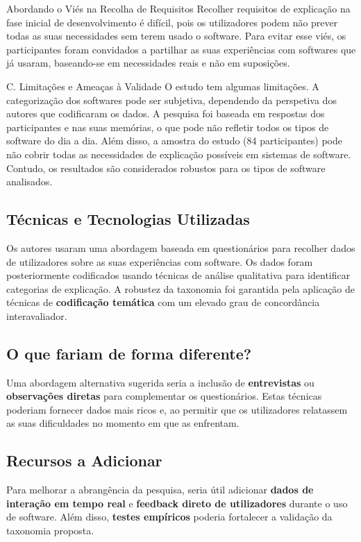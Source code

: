 \documentclass[conference]{IEEEtran}
\begin{document}
Abordando o Viés na Recolha de Requisitos
Recolher requisitos de explicação na fase inicial de desenvolvimento é difícil, pois os utilizadores podem não prever todas as suas necessidades sem terem usado o software. Para evitar esse viés, os participantes foram convidados a partilhar as suas experiências com softwares que já usaram, baseando-se em necessidades reais e não em suposições.

C. Limitações e Ameaças à Validade
O estudo tem algumas limitações. A categorização dos softwares pode ser subjetiva, dependendo da perspetiva dos autores que codificaram os dados. A pesquisa foi baseada em respostas dos participantes e nas suas memórias, o que pode não refletir todos os tipos de software do dia a dia. Além disso, a amostra do estudo (84 participantes) pode não cobrir todas as necessidades de explicação possíveis em sistemas de software. Contudo, os resultados são considerados robustos para os tipos de software analisados.


\subsection*{Técnicas e Tecnologias Utilizadas}
Os autores usaram uma abordagem baseada em questionários para recolher dados de utilizadores sobre as suas experiências com software. Os dados foram posteriormente codificados usando técnicas de análise qualitativa para identificar categorias de explicação. A robustez da taxonomia foi garantida pela aplicação de técnicas de \textbf{codificação temática} com um elevado grau de concordância interavaliador.

\subsection*{O que fariam de forma diferente?}
Uma abordagem alternativa sugerida seria a inclusão de \textbf{entrevistas} ou \textbf{observações diretas} para complementar os questionários. Estas técnicas poderiam fornecer dados mais ricos e, ao permitir que os utilizadores relatassem as suas dificuldades no momento em que as enfrentam.

\subsection*{Recursos a Adicionar}
Para melhorar a abrangência da pesquisa, seria útil adicionar \textbf{dados de interação em tempo real} e \textbf{feedback direto de utilizadores} durante o uso de software.  Além disso, \textbf{testes empíricos} poderia fortalecer a validação da taxonomia proposta.
\end{document}
